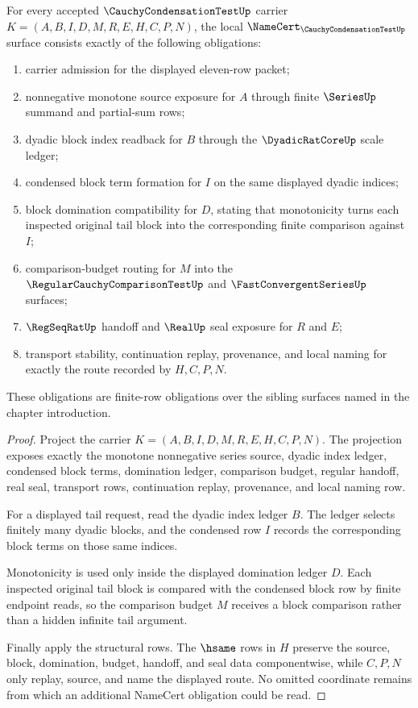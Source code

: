 \begin{theorem}
\label{thm:cauchy-condensation-test-namecert-obligations}
For every accepted $\CauchyCondensationTestUp$ carrier $K=(A,B,I,D,M,R,E,H,C,P,N)$, the local $\NameCert_{\CauchyCondensationTestUp}$ surface consists exactly of the following obligations:
\begin{enumerate}
\item carrier admission for the displayed eleven-row packet;
\item nonnegative monotone source exposure for $A$ through finite $\SeriesUp$ summand and partial-sum rows;
\item dyadic block index readback for $B$ through the $\DyadicRatCoreUp$ scale ledger;
\item condensed block term formation for $I$ on the same displayed dyadic indices;
\item block domination compatibility for $D$, stating that monotonicity turns each inspected original tail block into the corresponding finite comparison against $I$;
\item comparison-budget routing for $M$ into the $\RegularCauchyComparisonTestUp$ and $\FastConvergentSeriesUp$ surfaces;
\item $\RegSeqRatUp$ handoff and $\RealUp$ seal exposure for $R$ and $E$;
\item transport stability, continuation replay, provenance, and local naming for exactly the route recorded by $H,C,P,N$.
\end{enumerate}
These obligations are finite-row obligations over the sibling surfaces named in the chapter introduction.
\end{theorem}
\begin{proof}
Project the carrier $K=(A,B,I,D,M,R,E,H,C,P,N)$. The projection exposes exactly the monotone nonnegative series source, dyadic index ledger, condensed block terms, domination ledger, comparison budget, regular handoff, real seal, transport rows, continuation replay, provenance, and local naming row.

For a displayed tail request, read the dyadic index ledger $B$. The ledger selects finitely many dyadic blocks, and the condensed row $I$ records the corresponding block terms on those same indices.

Monotonicity is used only inside the displayed domination ledger $D$. Each inspected original tail block is compared with the condensed block row by finite endpoint reads, so the comparison budget $M$ receives a block comparison rather than a hidden infinite tail argument.

Finally apply the structural rows. The $\hsame$ rows in $H$ preserve the source, block, domination, budget, handoff, and seal data componentwise, while $C,P,N$ only replay, source, and name the displayed route. No omitted coordinate remains from which an additional NameCert obligation could be read.
\end{proof}

